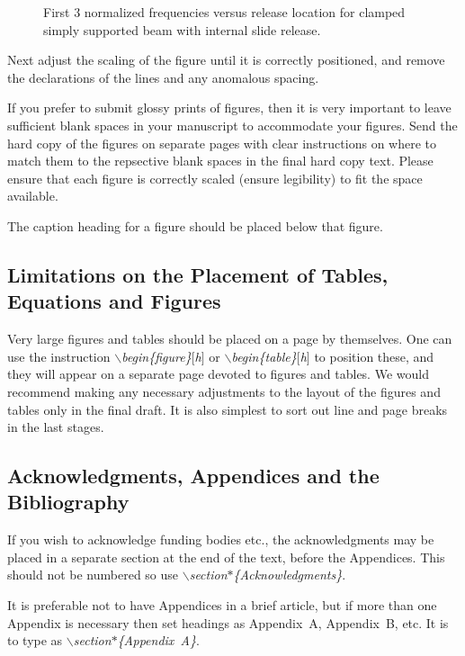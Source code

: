 \documentclass{ws-procs9x6}
\begin{document}
\begin{figure}[ht]
\centerline{\epsfxsize=4.1in}   
\caption{First 3 normalized frequencies versus release location for
clamped simply supported beam with internal slide
release. \label{inter}}
\end{figure}

Next adjust the scaling of the figure until it is correctly 
positioned, and remove the declarations of the lines and any 
anomalous spacing.

If you prefer to submit glossy prints of figures, then it is very 
important to leave sufficient blank spaces in your manuscript 
to accommodate your figures. Send the hard copy of the figures 
on separate pages with clear instructions on where to match 
them to the repsective blank spaces in the final hard copy 
text. Please ensure that each figure is correctly
scaled (ensure legibility) to fit the space available.

The caption heading for a figure should be placed below
that figure.

\subsection{Limitations on the Placement of Tables, 
Equations and Figures}\label{sec:plac}
Very large figures and tables should be placed on a page by themselves. One
can use the instruction {\em $\backslash$begin\{figure\}$[$h$]$} or
{\em $\backslash$begin\{table\}$[$h$]$}
to position these, and they will appear on a separate page devoted to
figures and tables. We would recommend making any necessary
adjustments to the layout of the figures and tables
only in the final draft. It is also simplest to sort out line and
page breaks in the last stages.

\subsection{Acknowledgments, Appendices and the Bibliography}
If you wish to acknowledge funding bodies etc., 
the acknowledgments may be placed in a separate section at the end of the
text, before the Appendices. This should not be numbered so use
{\em $\backslash$section$\ast$\{Acknowledgments\}}.

It is preferable not to have Appendices in a brief article, but if
more than one Appendix is necessary then set headings as Appendix~A,
Appendix~B, etc. It is to type as 
{\em $\backslash$section$\ast$\{Appendix~A\}}.
\end{document}
